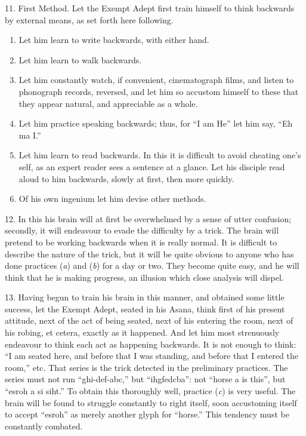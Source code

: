 11. First Method.  Let the Exempt Adept first train himself to think backwards by external means, as set forth here following.
\begin{enumerate}[label=(\alph*)]
\item Let him learn to write backwards, with either hand.
\item Let him learn to walk backwards.
\item Let him constantly watch, if convenient, cinematograph films, and listen to phonograph records, reversed, and let him so accustom himself to these that they appear natural, and appreciable as a whole.
\item Let him practice speaking backwards; thus, for \enquote{I am He} let him say, \enquote{Eh ma I.}
\item Let him learn to read backwards. In this it is difficult to avoid cheating one's self, as an expert reader sees a sentence at a glance. Let his disciple read aloud to him backwards, slowly at first, then more quickly.
\item Of his own ingenium let him devise other methods.
\end{enumerate}

12. In this his brain will at first be overwhelmed by a sense of utter confusion; secondly, it will endeavour to evade the difficulty by a trick. The brain will pretend to be working backwards when it is really normal. It is difficult to describe the nature of the trick, but it will be quite obvious to anyone who has done practices (\textit{a}) and (\textit{b}) for a day or two. They become quite easy, and he will think that he is making progress, an illusion which close analysis will dispel.

13. Having begun to train his brain in this manner, and obtained some little success, let the Exempt Adept, seated in his Asana, think first of his present attitude, next of the act of being seated, next of his entering the room, next of his robing, et cetera, exactly as it happened. And let him most strenuously endeavour to think each act as happening backwards. It is not enough to think: \enquote{I am seated here, and before that I was standing, and before that I entered the room,} etc. That series is the trick detected in the preliminary practices.  The series must not run \mbox{\enquote{ghi-def-abc,}} but \mbox{\enquote{ihgfedcba}}: not \enquote{horse a is this}, but \enquote{esroh a si siht.} To obtain this thoroughly well, practice (\textit{c}) is very useful. The brain will be found to struggle constantly to right itself, soon accustoming itself to accept \enquote{esroh} as merely another glyph for \enquote{horse.} This tendency must be constantly combated.

